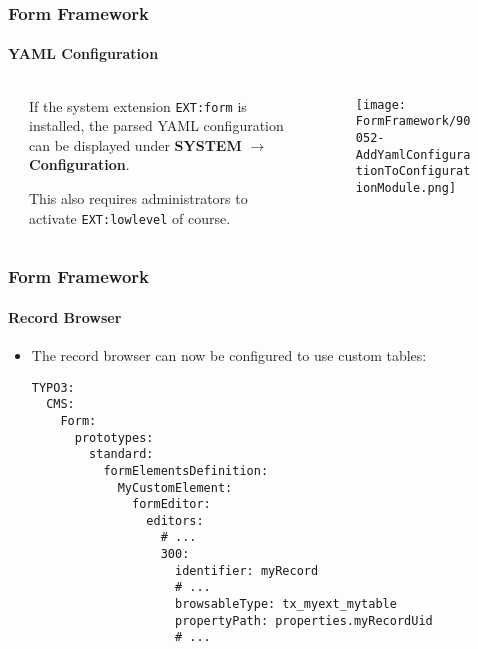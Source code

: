 
\begin{frame}[fragile]
	\frametitle{Form Framework}
	\framesubtitle{YAML Configuration}

	\begin{columns}[T]
		\begin{column}{.04\textwidth}
		\end{column}
		\begin{column}{.38\textwidth}

			If the system extension \texttt{EXT:form} is installed, the parsed YAML configuration
			can be displayed under \textbf{SYSTEM} $\rightarrow$ \textbf{Configuration}.

			\vspace{0.2cm}

			This also requires administrators to activate \texttt{EXT:lowlevel} of course.

		\end{column}
		\begin{column}{.58\textwidth}
			\vspace{-0.3cm}
			\begin{figure}
				\texttt{[image: FormFramework/90052-AddYamlConfigurationToConfigurationModule.png]}
			\end{figure}
		\end{column}
	\end{columns}

\end{frame}


\begin{frame}[fragile]
	\frametitle{Form Framework}
	\framesubtitle{Record Browser}

	\lstset{basicstyle=\tiny\ttfamily}

	\begin{itemize}
		\item The record browser can now be configured to use custom tables:
\begin{lstlisting}
TYPO3:
  CMS:
    Form:
      prototypes:
        standard:
          formElementsDefinition:
            MyCustomElement:
              formEditor:
                editors:
                  # ...
                  300:
                    identifier: myRecord
                    # ...
                    browsableType: tx_myext_mytable
                    propertyPath: properties.myRecordUid
                    # ...
\end{lstlisting}

	\end{itemize}

\end{frame}

